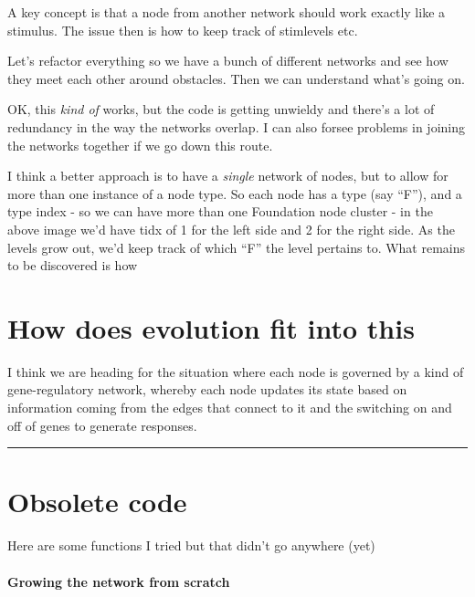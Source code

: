 \documentclass[]{article}
\let\oldparagraph\paragraph
\renewcommand{\paragraph}[1]{\oldparagraph{#1}\mbox{}}
\begin{document}
A key concept is that a node from another network should work exactly
like a stimulus. The issue then is how to keep track of stimlevels etc.

Let's refactor everything so we have a bunch of different networks and
see how they meet each other around obstacles. Then we can understand
what's going on.


OK, this \emph{kind of} works, but the code is getting unwieldy and
there's a lot of redundancy in the way the networks overlap. I can also
forsee problems in joining the networks together if we go down this
route.

I think a better approach is to have a \emph{single} network of nodes,
but to allow for more than one instance of a node type. So each node has
a type (say ``F''), and a type index - so we can have more than one
Foundation node cluster - in the above image we'd have tidx of 1 for the
left side and 2 for the right side. As the levels grow out, we'd keep
track of which ``F'' the level pertains to. What remains to be
discovered is how

\hypertarget{how-does-evolution-fit-into-this}{%
\section{How does evolution fit into
this}\label{how-does-evolution-fit-into-this}}

I think we are heading for the situation where each node is governed by
a kind of gene-regulatory network, whereby each node updates its state
based on information coming from the edges that connect to it and the
switching on and off of genes to generate responses.

\begin{center}\rule{0.5\linewidth}{0.5pt}\end{center}

\hypertarget{obsolete-code}{%
\section{Obsolete code}\label{obsolete-code}}

Here are some functions I tried but that didn't go anywhere (yet)

\hypertarget{growing-the-network-from-scratch}{%
\paragraph{Growing the network from
scratch}\label{growing-the-network-from-scratch}}
\end{document}
